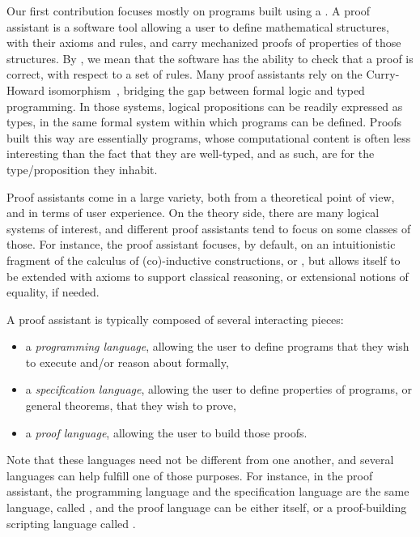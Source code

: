 Our first contribution focuses mostly on programs built using a .  A proof assistant is a software tool allowing a user to define
mathematical structures, with their axioms and rules, and carry mechanized
proofs of properties of those structures.  By , we mean that
the software has the ability to check that a proof is correct, with respect to a
set of rules.  Many proof assistants rely on the Curry-Howard
isomorphism~\cite{howard1980formulae}, bridging the gap between formal logic and
typed programming.  In those systems, logical propositions can be readily
expressed as types, in the same formal system within which programs can be
defined.  Proofs built this way are essentially programs, whose computational
content is often less interesting than the fact that they are well-typed, and as
such, are  for the type/proposition they inhabit.

Proof assistants come in a large variety, both from a theoretical point of view,
and in terms of user experience.  On the theory side, there are many logical
systems of interest, and different proof assistants tend to focus on some
classes of those.  For instance, the \Coq{} proof assistant focuses, by default,
on an intuitionistic fragment of the calculus of (co)-inductive constructions,
or , but allows itself to be extended with axioms to support
classical reasoning, or extensional notions of equality, if needed.

A proof assistant is typically composed of several interacting pieces:

\begin{itemize}

  \item a \emph{programming language}, allowing the user to define programs that
they wish to execute and/or reason about formally,

  \item a \emph{specification language}, allowing the user to define properties
of programs, or general theorems, that they wish to prove,

  \item a \emph{proof language}, allowing the user to build those proofs.

\end{itemize}

Note that these languages need not be different from one another, and several
languages can help fulfill one of those purposes.  For instance, in the \Coq{}
proof assistant, the programming language and the specification language are the
same language, called \Gallina{}, and the proof language can be either
\Gallina{} itself, or a proof-building scripting language called \Ltac{}.

